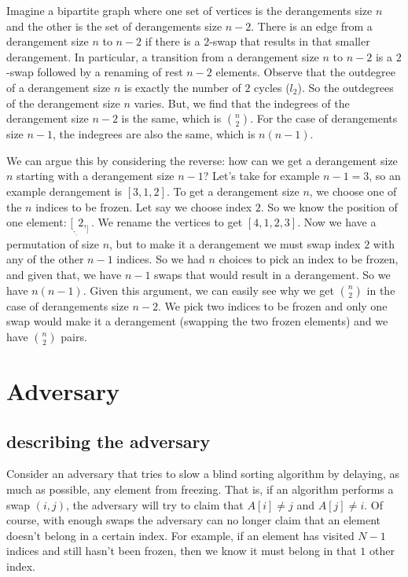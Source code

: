 \documentclass{article}
\begin{document}
Imagine a bipartite graph where one set of vertices is the derangements size $n$ and the
other is the set of derangements size $n - 2$. There is an edge from a derangement size
$n$ to $n - 2$ if there is a $2$-swap that results in that smaller derangement. 
In particular, a transition from a derangement size $n$ to $n - 2$ is a $2$-swap followed
by a renaming of rest $n - 2$ elements.
Observe that the outdegree of a derangement size $n$ is exactly the number of $2$ cycles ($l_2$).
So the outdegrees of the derangement size $n$ varies. But, we find that the indegrees of the
derangement size $n - 2$ is the same, which is ${n \choose 2}$. For the case
of derangements size $n - 1$, the indegrees are also the same, which is $n(n-1)$.

We can argue this by considering the reverse: how can we get a derangement size $n$ starting
with a derangement size $n - 1$? Let's take for example $n - 1 = 3$, so an example
derangement is $[3, 1, 2]$. To get a derangement size $n$, we choose one of the $n$ 
indices to be frozen. Let say we choose index $2$. So we know the position of one element:
$[_, _, 2, _]$. We rename the vertices to get $[4, 1, 2, 3]$. Now we have a permutation
of size $n$, but to make it a derangement we must swap index $2$ with any of the other $n - 1$ indices.
So we had $n$ choices to pick an index to be frozen, and given that, we have $n - 1$ swaps that would
result in a derangement. So we have $n(n - 1)$. Given this argument, we can easily see why 
we get ${n \choose 2}$ in the case of derangements size $n - 2$. We pick two indices to be frozen
and only one swap would make it a derangement (swapping the two frozen elements) and we have ${n \choose 2}$ pairs.

\section{Adversary}
\subsection{describing the adversary}
Consider an adversary that tries to slow a blind sorting algorithm by delaying, as much as possible, any
element from freezing.
That is, if an algorithm performs a swap $(i, j)$, the adversary will try to claim that $A[i] \neq j$ and
$A[j] \neq i$. Of course, with enough swaps the adversary can no longer claim that an element doesn't
belong in a certain index. For example, if an element has visited $N - 1$ indices and still hasn't been frozen,
then we know it must belong in that $1$ other index.
\end{document}
